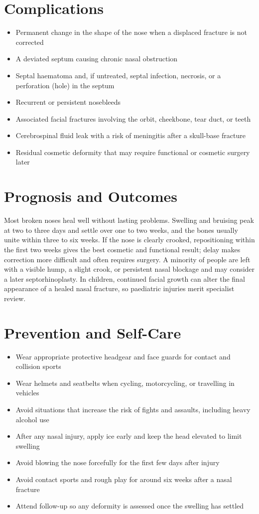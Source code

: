\section*{Complications}
\begin{itemize}
    \item Permanent change in the shape of the nose when a displaced fracture is not corrected
    \item A deviated septum causing chronic nasal obstruction
    \item Septal haematoma and, if untreated, septal infection, necrosis, or a perforation (hole) in the septum
    \item Recurrent or persistent nosebleeds
    \item Associated facial fractures involving the orbit, cheekbone, tear duct, or teeth
    \item Cerebrospinal fluid leak with a risk of meningitis after a skull-base fracture
    \item Residual cosmetic deformity that may require functional or cosmetic surgery later
\end{itemize}

\section*{Prognosis and Outcomes}
Most broken noses heal well without lasting problems. Swelling and bruising peak at two to three days and settle over one to two weeks, and the bones usually unite within three to six weeks. If the nose is clearly crooked, repositioning within the first two weeks gives the best cosmetic and functional result; delay makes correction more difficult and often requires surgery. A minority of people are left with a visible hump, a slight crook, or persistent nasal blockage and may consider a later septorhinoplasty. In children, continued facial growth can alter the final appearance of a healed nasal fracture, so paediatric injuries merit specialist review.

\section*{Prevention and Self-Care}
\begin{itemize}
    \item Wear appropriate protective headgear and face guards for contact and collision sports
    \item Wear helmets and seatbelts when cycling, motorcycling, or travelling in vehicles
    \item Avoid situations that increase the risk of fights and assaults, including heavy alcohol use
    \item After any nasal injury, apply ice early and keep the head elevated to limit swelling
    \item Avoid blowing the nose forcefully for the first few days after injury
    \item Avoid contact sports and rough play for around six weeks after a nasal fracture
    \item Attend follow-up so any deformity is assessed once the swelling has settled
\end{itemize}

